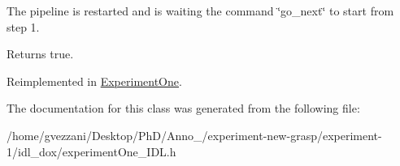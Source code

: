 The pipeline is restarted and is waiting the command \char`\"{}go\-\_\-next\char`\"{} to start from step 1. 

\begin{DoxyReturn}{Returns}
true. 
\end{DoxyReturn}


Reimplemented in \hyperlink{classExperimentOne_ac01beb32e67fd6067c273ae505060139}{Experiment\-One}.



The documentation for this class was generated from the following file\-:\begin{DoxyCompactItemize}
\item 
/home/gvezzani/\-Desktop/\-Ph\-D/\-Anno\-\_/experiment-\/new-\/grasp/experiment-\/1/idl\-\_\-dox/experiment\-One\-\_\-\-I\-D\-L.\-h\end{DoxyCompactItemize}
